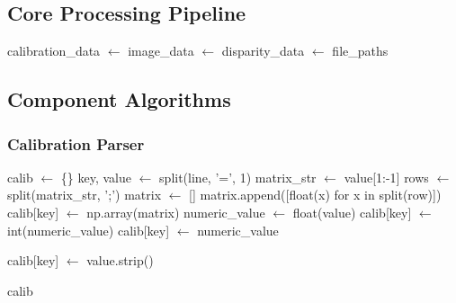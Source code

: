 \documentclass[12pt]{article}
\begin{document}
\subsection{Core Processing Pipeline}

\begin{algorithm}[H]
\caption{Data Preprocessing Main Workflow}
\begin{algorithmic}[1]
\State calibration\_data $\gets$ 
\State image\_data $\gets$ 
\State disparity\_data $\gets$ 
\State {}
\State \Return file\_paths
\EndProcedure
\end{algorithmic}
\end{algorithm}

\subsection{Component Algorithms}

\subsubsection{Calibration Parser}
\begin{algorithm}[H]
\caption{Calibration File Processing}
\begin{algorithmic}[1]
\State calib $\gets$ \{\}
\State {}
    \State {}
        \State key, value $\gets$ split(line, '=', 1)
        \State {}
            \State matrix\_str $\gets$ value[1:-1]
            \State rows $\gets$ split(matrix\_str, ';')
            \State matrix $\gets$ []
            \State {}
                \State matrix.append([float(x) for x in split(row)])
            \EndFor
            \State calib[key] $\gets$ np.array(matrix)
        \Else
            \State 
                \State numeric\_value $\gets$ float(value)
                \State {} 
                    \State calib[key] $\gets$ int(numeric\_value)
                \Else
                    \State calib[key] $\gets$ numeric\_value
                \EndIf
            
                \State calib[key] $\gets$ value.strip()
            
        \EndIf
    \EndIf
\EndFor
\State \Return calib
\EndFunction
\end{algorithmic}
\end{algorithm}
\end{document}

